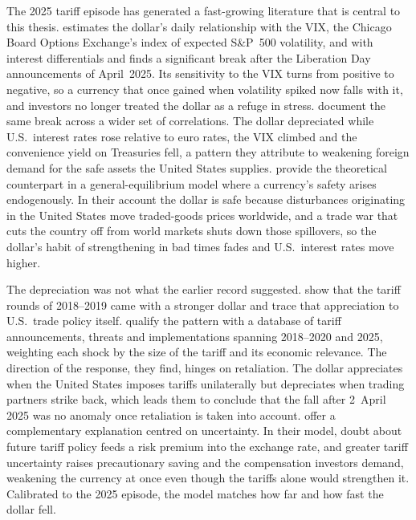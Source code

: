 The 2025 tariff episode has generated a fast-growing literature that is central to
this thesis. \textcite{kamin_2025} estimates the dollar's daily relationship with the VIX, the Chicago Board Options Exchange's index of expected S\&P~500 volatility, and with interest differentials and finds a significant break after the Liberation Day announcements of
April~2025. Its sensitivity to the VIX turns from positive to negative, so a currency that
once gained when volatility spiked now falls with it, and investors no longer
treated the dollar as a refuge in stress.
\textcite{jiang_krishnamurthy_lustig_richmond_2026} document the same break across
a wider set of correlations. The dollar depreciated while U.S.\ interest rates rose
relative to euro rates, the VIX climbed and the convenience yield on Treasuries
fell, a pattern they attribute to weakening foreign demand for the safe assets the
United States supplies. \textcite{hassan_mertens_wang_zhang_2025} provide the
theoretical counterpart in a general-equilibrium model where a currency's safety
arises endogenously. In their account the dollar is safe because disturbances originating in the United States move traded-goods prices worldwide, and a trade war that cuts the country off from world markets shuts down those spillovers, so the dollar's habit of strengthening in bad times fades and U.S.\ interest rates move higher.

The depreciation was not what the earlier record suggested.
\textcite{khalil_strobel_2024} show that the tariff rounds of 2018--2019 came with
a stronger dollar and trace that appreciation to U.S.\ trade policy itself.
\textcite{ostry_lloyd_corsetti_2025} qualify the pattern with a database of tariff
announcements, threats and implementations spanning 2018--2020 and 2025, weighting
each shock by the size of the tariff and its economic relevance. The direction of
the response, they find, hinges on retaliation. The dollar appreciates when the
United States imposes tariffs unilaterally but depreciates when trading partners
strike back, which leads them to conclude that the fall after 2~April 2025 was no
anomaly once retaliation is taken into account.
\textcite{kalemliozcan_soylu_yildirim_2026} offer a complementary explanation
centred on uncertainty. In their model, doubt about future tariff policy feeds a
risk premium into the exchange rate, and greater tariff uncertainty raises
precautionary saving and the compensation investors demand, weakening the currency
at once even though the tariffs alone would strengthen it. Calibrated to the 2025
episode, the model matches how far and how fast the dollar fell.

